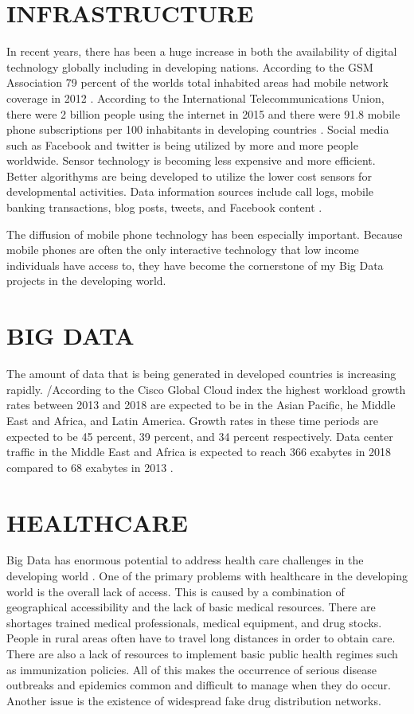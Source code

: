 \documentclass[sigconf]{acmart}
\begin{document}
\section{INFRASTRUCTURE}
In recent years, there has been a huge increase in both the availability of digital technology globally including in developing nations. According to the GSM Association 79 percent of the worlds total inhabited areas had mobile network coverage in 2012 \cite{DevEcon}. According to the International Telecommunications Union,  there were 2 billion people using the internet in 2015 and there were 91.8 mobile phone subscriptions per 100 inhabitants in developing countries \cite{DevEcon}.  Social media such as Facebook and twitter is being utilized by more and more people worldwide. Sensor technology is becoming less expensive and more efficient. Better algorithyms are being developed to utilize the lower cost sensors for developmental activities. Data information sources include call logs, mobile banking transactions, blog posts, tweets, and Facebook content \cite{www-google-GloPls}.

The diffusion of mobile phone technology has been especially important. Because mobile phones are often the only interactive technology that low income individuals have access to, they have become the cornerstone of my Big Data projects in the developing world.

\section{BIG DATA}
The amount of data that is being generated in developed countries is increasing rapidly.  /According to the Cisco Global Cloud index the highest workload growth rates between 2013 and 2018 are expected to be in the Asian Pacific, he Middle East and Africa, and Latin America.  Growth rates in these time periods are expected to be 45 percent, 39 percent, and 34 percent respectively.  Data center traffic in the Middle East and Africa is expected to reach 366 exabytes in 2018 compared to 68 exabytes in 2013 \cite{DevEcon}. 

\section{HEALTHCARE}

Big Data has enormous potential to address health care challenges in the developing world \cite{DevEcon}. One of the primary problems with healthcare in the developing world is the overall lack of access. This is caused by a combination of geographical accessibility and the lack of basic medical resources. There are shortages trained medical professionals, medical equipment,  and drug stocks. People in rural areas often have to travel long distances in order to obtain care. There are also a lack of resources to implement basic public health regimes such as immunization policies.  All of this makes the occurrence of serious disease outbreaks and epidemics common and difficult to manage when they do occur. Another issue is the existence of widespread fake drug distribution networks.
\end{document}
